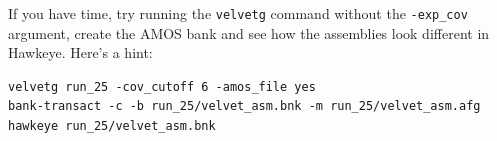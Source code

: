 \begin{bonus}
If you have time, try running the \texttt{velvetg} command without the
\texttt{-exp\_cov} argument, create the AMOS bank and see how the assemblies
look different in Hawkeye. Here's a hint:
\begin{lstlisting}
velvetg run_25 -cov_cutoff 6 -amos_file yes
bank-transact -c -b run_25/velvet_asm.bnk -m run_25/velvet_asm.afg
hawkeye run_25/velvet_asm.bnk
\end{lstlisting}

\end{bonus}

\begin{advanced}

\end{advanced}
